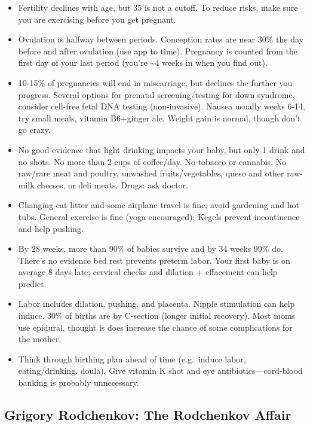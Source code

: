 \documentclass[
]{article}
\begin{document}
\begin{itemize}
\item
  Fertility declines with age, but 35 is not a cutoff. To reduce risks,
  make sure you are exercising before you get pregnant.
\item
  Ovulation is halfway between periods. Conception rates are near 30\%
  the day before and after ovulation (use app to time). Pregnancy is
  counted from the first day of your last period (you're
  \textasciitilde4 weeks in when you find out).
\item
  10-15\% of pregnancies will end in miscarriage, but declines the
  further you progress. Several options for prenatal screening/testing
  for down syndrome, consider cell-free fetal DNA testing
  (non-invasive). Nausea usually weeks 6-14, try small meals, vitamin
  B6+ginger ale. Weight gain is normal, though don't go crazy.
\item
  No good evidence that light drinking impacts your baby, but only 1
  drink and no shots. No more than 2 cups of coffee/day. No tobacco or
  cannabis. No raw/rare meat and poultry, unwashed fruits/vegetables,
  queso and other raw-milk cheeses, or deli meats. Drugs: ask doctor.
\item
  Changing cat litter and some airplane travel is fine; avoid gardening
  and hot tubs. General exercise is fine (yoga encouraged); Kegels
  prevent incontinence and help pushing.
\item
  By 28 weeks, more than 90\% of babies survive and by 34 weeks 99\% do.
  There's no evidence bed rest prevents preterm labor. Your first baby
  is on average 8 days late; cervical checks and dilation + effacement
  can help predict.
\item
  Labor includes dilation, pushing, and placenta. Nipple stimulation can
  help induce. 30\% of births are by C-section (longer initial
  recovery). Most moms use epidural, thought is does increase the chance
  of some complications for the mother.
\item
  Think through birthing plan ahead of time (e.g.~induce labor,
  eating/drinking, doula). Give vitamin K shot and eye
  antibiotics---cord-blood banking is probably unnecessary.
\end{itemize}

\hypertarget{grigory-rodchenkov-the-rodchenkov-affair}{%
\subsection{Grigory Rodchenkov: The Rodchenkov
Affair}\label{grigory-rodchenkov-the-rodchenkov-affair}}
\end{document}
